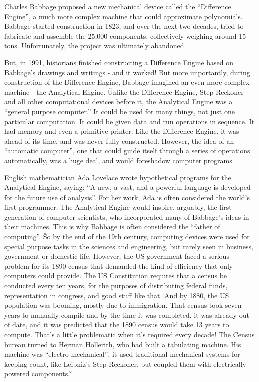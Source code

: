 Charles Babbage proposed a new mechanical device called the ``Difference Engine'', a much more complex machine that
could approximate polynomials. Babbage started construction in 1823, and over the next two decades, tried to
fabricate and assemble the 25,000 components, collectively weighing around 15 tons. Unfortunately, the project was
ultimately abandoned.


But, in 1991, historians finished constructing a Difference Engine based on Babbage's drawings and writings - and it
worked! But more importantly, during construction of the Difference Engine, Babbage imagined an even more complex
machine - the Analytical Engine. \v

Unlike the Difference Engine, Step Reckoner and all other computational devices before it, the Analytical Engine was
a ``general purpose computer.'' It could be used for many things, not just one particular computation. It could be
given data and run operations in sequence. It had memory and even a primitive printer. Like the Difference Engine, it
was ahead of its time, and was never fully constructed. However, the idea of an ``automatic computer'', one that
could guide itself through a series of operations automatically, was a huge deal, and would foreshadow computer
programs.


English mathematician Ada Lovelace wrote hypothetical programs for the Analytical Engine, saying: ``A new, a vast,
and a powerful language is developed for the future use of analysis''. For her work, Ada is often considered the
world's first programmer. The Analytical Engine would inspire, arguably, the first generation of computer scientists,
who incorporated many of Babbage's ideas in their machines. This is why Babbage is often considered the ``father of
computing''. \v

So by the end of the 19th century, computing devices were used for special purpose tasks in the sciences and
engineering, but rarely seen in business, government or domestic life. However, the US government faced a serious
problem for its 1890 census that demanded the kind of efficiency that only computers could provide. \v

The US Constitution requires that a census be conducted every ten years, for the purposes of distributing federal
funds, representation in congress, and good stuff like that. And by 1880, the US population was booming, mostly due
to immigration. That census took seven years to manually compile and by the time it was completed, it was already out
of date, and it was predicted that the 1890 census would take 13 years to compute. That's a little problematic when
it's required every decade! The Census bureau turned to Herman Hollerith, who had built a tabulating machine. His
machine was ``electro-mechanical'', it used traditional mechanical systems for keeping count, like Leibniz's Step
Reckoner, but coupled them with electrically-powered components. \v

